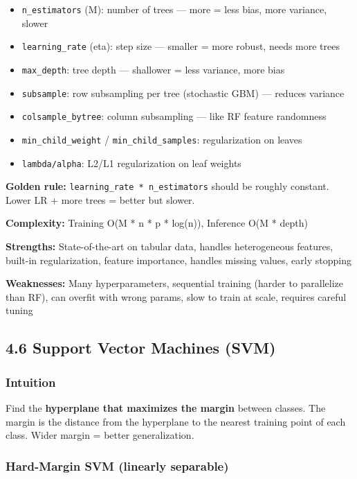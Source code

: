 \documentclass[11pt]{article}
\providecommand{\tightlist}{\setlength{\itemsep}{1pt}\setlength{\parskip}{0pt}}
\begin{document}
\begin{itemize}
\tightlist
\item
  \texttt{n\_estimators} (M): number of trees --- more = less bias, more variance, slower
\item
  \texttt{learning\_rate} (eta): step size --- smaller = more robust, needs more trees
\item
  \texttt{max\_depth}: tree depth --- shallower = less variance, more bias
\item
  \texttt{subsample}: row subsampling per tree (stochastic GBM) --- reduces variance
\item
  \texttt{colsample\_bytree}: column subsampling --- like RF feature randomness
\item
  \texttt{min\_child\_weight} / \texttt{min\_child\_samples}: regularization on leaves
\item
  \texttt{lambda/alpha}: L2/L1 regularization on leaf weights
\end{itemize}

\textbf{Golden rule:} \texttt{learning\_rate\ *\ n\_estimators} should be roughly constant. Lower LR + more trees = better but slower.

\textbf{Complexity:} Training O(M * n * p * log(n)), Inference O(M * depth)

\textbf{Strengths:} State-of-the-art on tabular data, handles heterogeneous features, built-in regularization, feature importance, handles missing values, early stopping

\textbf{Weaknesses:} Many hyperparameters, sequential training (harder to parallelize than RF), can overfit with wrong params, slow to train at scale, requires careful tuning

\subsection{4.6 Support Vector Machines (SVM)}\label{46-support-vector-machines-svm}

\subsubsection{Intuition}\label{intuition-5}

Find the \textbf{hyperplane that maximizes the margin} between classes. The margin is the distance from the hyperplane to the nearest training point of each class. Wider margin = better generalization.

\subsubsection{Hard-Margin SVM (linearly separable)}\label{hard-margin-svm-linearly-separable}
\end{document}
